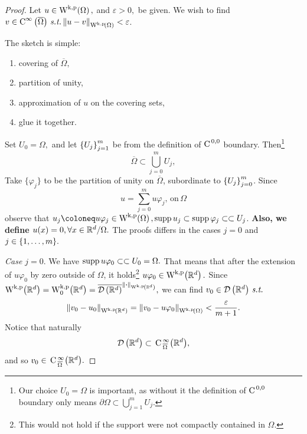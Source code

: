 \documentclass{article}
\begin{document}
\begin{proof}
	Let $u \in \WkpSet{\Omega},$ and $\varepsilon >0,$ be given. We wish  to find $v \in \CinfSet{\overline{\Omega}}\, \text{\textit{s.t.}} \,  \norm{u-v}_{\WkpSet{\Omega}} < \varepsilon$.

	The sketch is simple:  
	\begin{enumerate}
		\item covering of $\overline{\Omega},$
		\item partition of unity,
		\item approximation of $u$ on the covering sets,
		\item glue it together.
	\end{enumerate}

	Set $U_0 = \Omega,$ and let $\qty{U_j}_{j=1}^m$ be from the definition of $\text{C}^{\!\,\, 0,0}$ boundary. Then\footnote{Our choice $U_0 = \Omega$ is important, as without it the definition of $\text{C}^{\!\,\, 0,0}$ boundary only means $\partial \Omega \subset \bigcup_{j=1}^m U_j.$}
	\[
		\overline{\Omega} \subset \bigcup_{j=0}^m U_j,
	\]
	Take $\{\varphi_j\}$ to be the partition of unity on $\overline{\Omega}$, subordinate to $\qty{U_j}_{j=0}^m$. Since
	\[
		u = \sum_{j=0}^m u \varphi_j, \, \text{on} \, \Omega
	\]
	observe that $u_j \coloneq u \varphi_j \in \WkpSet{\Omega}, \supp u_j \subset \supp \varphi_j \subset \subset U_j$. \textbf{Also, we define $u(x) = 0, \forall x \in {\mathbb R}^{d}/\Omega.$} 
	The proofs differs in the cases $j = 0$ and $j \in \qty{1, \dots, m}.$

	\textit{Case $j=0$}.
	We have $ \operatorname{supp} u \varphi_0 \subset \subset U_0 = \Omega.$ That means that after the extension of $u \varphi_0$ by zero outside of $\Omega$, it holds\footnote{This would not hold if the support were not compactly contained in $\Omega$.} $u \varphi_0 \in \WkpSet{\R^d}.$ Since $\WkpSet{\R^d} = \WkpzeroSet{\R^d} = \overline{\DSet{\R^{d}}}^{\norm{\vdot}_{\WkpSet{\R^{d}}}},$ we can find $v_0 \in \mathcal{D}\!\,\left({\mathbb R}^{d} \right) \, \text{\textit{s.t.}} \,$
	\[
	\norm{v_0 -u_0}_{\WkpSet{\R^{d}}} = \norm{v_0 - u \varphi_0}_{\WkpSet{\Omega}} < \frac{\varepsilon}{m+1}.
	\]
	Notice that naturally
	\[
		\mathcal{D}\!\,\left({\mathbb R}^{d} \right) \subset \, \text{C} \,^{\infty}_{\overline{\Omega}}\qty({\mathbb R}^{d}),
	\]
	and so $v_0 \in \, \text{C} \,^{\infty}_{\overline{\Omega}}\qty({\mathbb R}^{d}).$


\end{proof}
\end{document}
